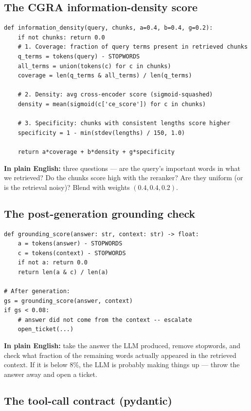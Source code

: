 \documentclass[11pt,a4paper]{article}
\begin{document}
\subsection{The CGRA information-density score}

\begin{lstlisting}
def information_density(query, chunks, a=0.4, b=0.4, g=0.2):
    if not chunks: return 0.0
    # 1. Coverage: fraction of query terms present in retrieved chunks
    q_terms = tokens(query) - STOPWORDS
    all_terms = union(tokens(c) for c in chunks)
    coverage = len(q_terms & all_terms) / len(q_terms)

    # 2. Density: avg cross-encoder score (sigmoid-squashed)
    density = mean(sigmoid(c['ce_score']) for c in chunks)

    # 3. Specificity: chunks with consistent lengths score higher
    specificity = 1 - min(stdev(lengths) / 150, 1.0)

    return a*coverage + b*density + g*specificity
\end{lstlisting}

\textbf{In plain English:} three questions --- are the query's important words in what we retrieved? Do the chunks score high with the reranker? Are they uniform (or is the retrieval noisy)? Blend with weights $(0.4, 0.4, 0.2)$.

\subsection{The post-generation grounding check}

\begin{lstlisting}
def grounding_score(answer: str, context: str) -> float:
    a = tokens(answer) - STOPWORDS
    c = tokens(context) - STOPWORDS
    if not a: return 0.0
    return len(a & c) / len(a)

# After generation:
gs = grounding_score(answer, context)
if gs < 0.08:
    # answer did not come from the context -- escalate
    open_ticket(...)
\end{lstlisting}

\textbf{In plain English:} take the answer the LLM produced, remove stopwords, and check what fraction of the remaining words actually appeared in the retrieved context. If it is below 8\%, the LLM is probably making things up --- throw the answer away and open a ticket.

\subsection{The tool-call contract (pydantic)}
\end{document}
